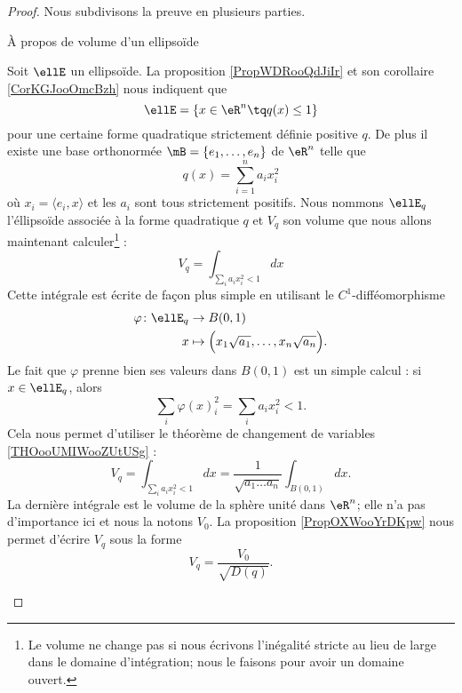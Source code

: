 \begin{proof}
    Nous subdivisons la preuve en plusieurs parties.
    \begin{subproof}
        \item[À propos de volume d'un ellipsoïde]

            Soit \( \ellE\) un ellipsoïde. La proposition \ref{PropWDRooQdJiIr} et son corollaire \ref{CorKGJooOmcBzh} nous indiquent que 
            \begin{equation}
                \ellE=\{ x\in \eR^n\tq q(x)\leq 1 \}
            \end{equation}
            pour une certaine forme quadratique strictement définie positive \( q\). De plus il existe une base orthonormée \( \mB=\{ e_1,\ldots, e_n \}\) de \( \eR^n\) telle que 
            \begin{equation}    \label{EqELBooQLPQUj}
                q(x)=\sum_{i=1}^na_ix_i^2
            \end{equation}
            où \( x_i=\langle e_i, x\rangle \) et les \( a_i\) sont tous strictement positifs. Nous nommons \( \ellE_q\) l'éllipsoïde associée à la forme quadratique \( q\) et \( V_q\) son volume que nous allons maintenant calculer\footnote{Le volume ne change pas si nous écrivons l'inégalité stricte au lieu de large dans le domaine d'intégration; nous le faisons pour avoir un domaine ouvert.} :
            \begin{equation}
                V_q=\int_{\sum_ia_ix_i^2<1}dx
            \end{equation}
            Cette intégrale est écrite de façon plus simple en utilisant le \( C^1\)-difféomorphisme
            \begin{equation}
                \begin{aligned}
                    \varphi\colon \ellE_q&\to B(0,1) \\
                    x&\mapsto \Big( x_1\sqrt{a_1},\ldots, x_n\sqrt{a_n} \Big). 
                \end{aligned}
            \end{equation}
            Le fait que \( \varphi\) prenne bien ses valeurs dans \( B(0,1)\) est un simple calcul : si \( x\in\ellE_q\), alors
            \begin{equation}
                \sum_i\varphi(x)_i^2=\sum_ia_ix_i^2<1.
            \end{equation}
            Cela nous permet d'utiliser le théorème de changement de variables \ref{THOooUMIWooZUtUSg} :
            \begin{equation}
                V_q=\int_{\sum_ia_ix_i^2<1}dx=\frac{1}{ \sqrt{a_1\ldots a_n} }\int_{B(0,1)}dx.
            \end{equation}
            La dernière intégrale est le volume de la sphère unité dans \( \eR^n\); elle n'a pas d'importance ici et nous la notons \( V_0\). La proposition \ref{PropOXWooYrDKpw} nous permet d'écrire \(V_q\) sous la forme
            \begin{equation}
                V_q=\frac{ V_0 }{ \sqrt{D(q)} }.
            \end{equation}
            

\end{subproof}
\end{proof}
